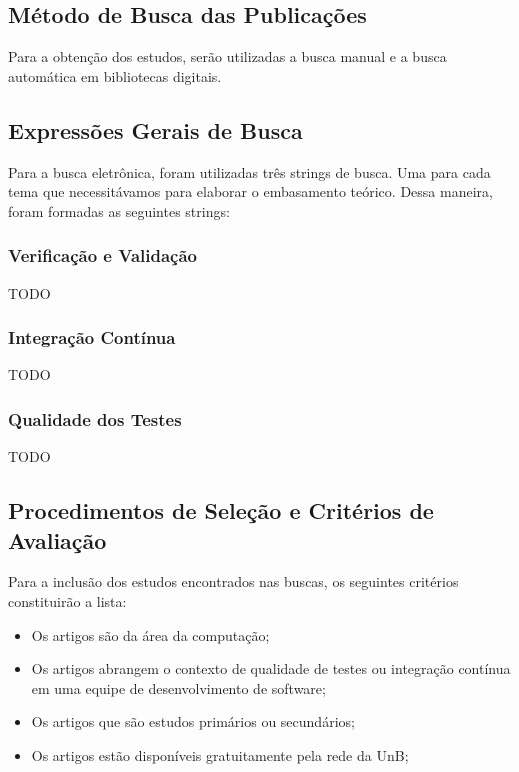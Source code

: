 \subsection{Método de Busca das Publicações}
\label{sub:Método de Busca das Publicações}
Para a obtenção dos estudos, serão utilizadas a busca manual e a busca
automática em bibliotecas digitais.

\subsection{Expressões Gerais de Busca}
\label{sub:Expressões Gerais de Busca}
Para a busca eletrônica, foram utilizadas três strings de busca.
Uma para cada tema que necessitávamos para elaborar o embasamento teórico.
Dessa maneira, foram formadas as seguintes strings:

\subsubsection{Verificação e Validação}
\label{sub:Verificação e Validação}
 TODO

\subsubsection{Integração Contínua}
\label{sub:Integração Contínua}
 TODO

\subsubsection{Qualidade dos Testes}
\label{sub:Qualidade dos Testes}
 TODO

\subsection{Procedimentos de Seleção e Critérios de Avaliação}
\label{sub:Procedimentos de Seleção e Critérios de Avaliação}

Para a inclusão dos estudos encontrados nas buscas, os seguintes
critérios constituirão a lista:

\begin{itemize}
    \item Os artigos são da área da computação;
    \item Os artigos abrangem o contexto de qualidade de testes ou integração
        contínua em uma equipe de desenvolvimento de software;
    \item Os artigos que são estudos primários ou secundários;
    \item Os artigos estão disponíveis gratuitamente pela rede da UnB;
\end{itemize}

